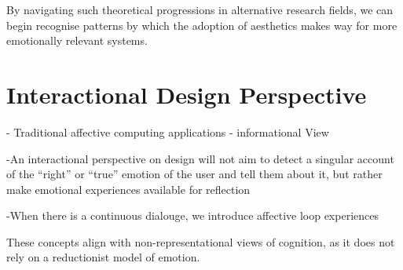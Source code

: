By navigating such theoretical progressions in alternative research fields, we can begin recognise patterns by which the adoption of aesthetics makes way for more emotionally relevant systems.

\section{Interactional Design Perspective}

- Traditional affective computing applications - informational View

-An  interactional  perspective  on  design  will  not aim to detect a singular account of the “right” or “true” emotion  of  the  user  and  tell  them  about  it,  but  rather  make  emotional  experiences  available  for  reflection

-When there is a continuous dialouge, we introduce affective loop experiences

These concepts align with non-representational views of cognition, as it does not rely on a reductionist model of emotion.  


